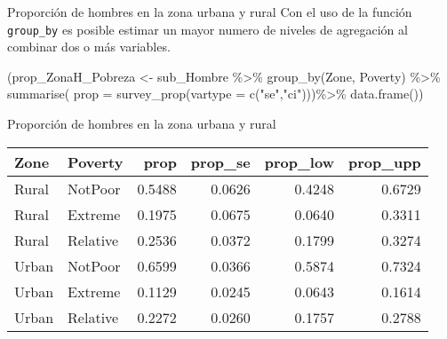 \documentclass[
  ignorenonframetext,
]{beamer}
\newenvironment{Shaded}{\begin{snugshade}}{\end{snugshade}}
\newcommand{\AttributeTok}[1]{\textcolor[rgb]{0.77,0.63,0.00}{#1}}
\newcommand{\FunctionTok}[1]{\textcolor[rgb]{0.00,0.00,0.00}{#1}}
\newcommand{\NormalTok}[1]{#1}
\newcommand{\OtherTok}[1]{\textcolor[rgb]{0.56,0.35,0.01}{#1}}
\newcommand{\SpecialCharTok}[1]{\textcolor[rgb]{0.00,0.00,0.00}{#1}}
\newcommand{\StringTok}[1]{\textcolor[rgb]{0.31,0.60,0.02}{#1}}
\begin{document}
\begin{frame}[fragile]{Proporción de hombres en la zona urbana y rural}
\protect\hypertarget{proporciuxf3n-de-hombres-en-la-zona-urbana-y-rural-1}{}
Con el uso de la función \texttt{group\_by} es posible estimar un mayor
numero de niveles de agregación al combinar dos o más variables.

\begin{Shaded}
\begin{Highlighting}[]
\NormalTok{(prop\_ZonaH\_Pobreza }\OtherTok{\textless{}{-}}\NormalTok{ sub\_Hombre }\SpecialCharTok{\%\textgreater{}\%}
   \FunctionTok{group\_by}\NormalTok{(Zone, Poverty) }\SpecialCharTok{\%\textgreater{}\%} 
   \FunctionTok{summarise}\NormalTok{(}
     \AttributeTok{prop =} \FunctionTok{survey\_prop}\NormalTok{(}\AttributeTok{vartype =} \FunctionTok{c}\NormalTok{(}\StringTok{"se"}\NormalTok{,}\StringTok{"ci"}\NormalTok{)))}\SpecialCharTok{\%\textgreater{}\%}
   \FunctionTok{data.frame}\NormalTok{())}
\end{Highlighting}
\end{Shaded}
\end{frame}

\begin{frame}{Proporción de hombres en la zona urbana y rural}
\protect\hypertarget{proporciuxf3n-de-hombres-en-la-zona-urbana-y-rural-2}{}
\begin{longtable}[]{@{}llrrrr@{}}
\toprule
Zone & Poverty & prop & prop\_se & prop\_low & prop\_upp \\
\midrule
\endhead
Rural & NotPoor & 0.5488 & 0.0626 & 0.4248 & 0.6729 \\
Rural & Extreme & 0.1975 & 0.0675 & 0.0640 & 0.3311 \\
Rural & Relative & 0.2536 & 0.0372 & 0.1799 & 0.3274 \\
Urban & NotPoor & 0.6599 & 0.0366 & 0.5874 & 0.7324 \\
Urban & Extreme & 0.1129 & 0.0245 & 0.0643 & 0.1614 \\
Urban & Relative & 0.2272 & 0.0260 & 0.1757 & 0.2788 \\
\bottomrule
\end{longtable}
\end{frame}
\end{document}
